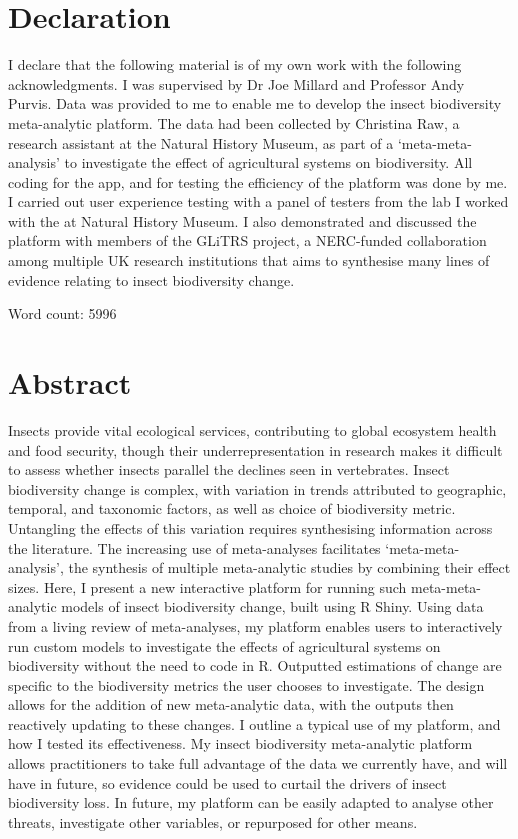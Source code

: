 \documentclass[11pt]{article}
\begin{document}
	\section{Declaration} %
		I declare that the following material is of my own work with the following acknowledgments. I was supervised by Dr Joe Millard and Professor Andy Purvis. Data was provided to me to enable me to develop the insect biodiversity meta-analytic platform. The data had been collected by Christina Raw, a research assistant at the Natural History Museum, as part of a ‘meta-meta-analysis’ to investigate the effect of agricultural systems on biodiversity. All coding for the app, and for testing the efficiency of the platform was done by me. I carried out user experience testing with a panel of testers from the lab I worked with the at Natural History Museum. I also demonstrated and discussed the platform with members of the GLiTRS project, a NERC-funded collaboration among multiple UK research institutions that aims to synthesise many lines of evidence relating to insect biodiversity change. 
		
		\noindent Word count: 5996


	\clearpage 
	
	\section{Abstract}
		Insects provide vital ecological services, contributing to global ecosystem health and food security, though their underrepresentation in research makes it difficult to assess whether insects parallel the declines seen in vertebrates. Insect biodiversity change is complex, with variation in trends attributed to geographic, temporal, and taxonomic factors, as well as choice of biodiversity metric. Untangling the effects of this variation requires synthesising information across the literature. The increasing use of meta-analyses facilitates ‘meta-meta-analysis’, the synthesis of multiple meta-analytic studies by combining their effect sizes. Here, I present a new interactive platform for running such meta-meta-analytic models of insect biodiversity change, built using R Shiny. Using data from a living review of meta-analyses, my platform enables users to interactively run custom models to investigate the effects of agricultural systems on biodiversity without the need to code in R. Outputted estimations of change are specific to the biodiversity metrics the user chooses to investigate. The design allows for the addition of new meta-analytic data, with the outputs then reactively updating to these changes. I outline a typical use of my platform, and how I tested its effectiveness. My insect biodiversity meta-analytic platform allows practitioners to take full advantage of the data we currently have, and will have in future, so evidence could be used to curtail the drivers of insect biodiversity loss. In future, my platform can be easily adapted to analyse other threats, investigate other variables, or repurposed for other means.
\end{document}
